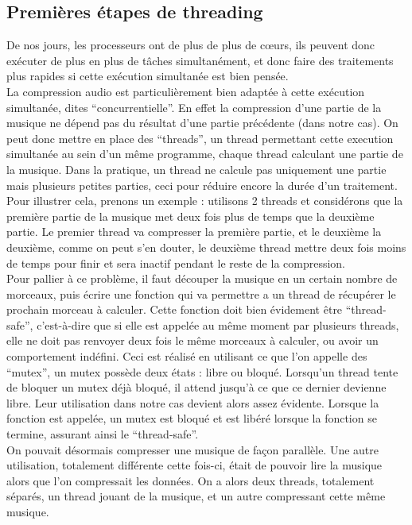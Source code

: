 \documentclass[a4paper,12pt]{article}
\begin{document}
	\subsection{Premières étapes de threading}
De nos jours, les processeurs ont de plus de plus de cœurs, ils peuvent donc
exécuter de plus en plus de tâches simultanément, et donc faire des traitements
plus rapides si cette exécution simultanée est bien pensée.\\
La compression audio est particulièrement bien adaptée à cette exécution
simultanée, dites ``concurrentielle''. En effet la compression d'une partie de
la musique ne dépend pas du résultat d'une partie précédente (dans notre cas).
On peut donc mettre en place des ``threads'', un thread permettant cette
execution simultanée au sein d'un même programme, chaque thread calculant une
partie de la musique. Dans la pratique, un thread ne calcule pas uniquement une
partie mais plusieurs petites parties, ceci pour réduire encore la durée d'un
traitement.  Pour illustrer cela, prenons un exemple : utilisons 2 threads et
considérons que la première partie de la musique met deux fois plus de temps que
la deuxième partie. Le premier thread va compresser la première partie, et le
deuxième la deuxième, comme on peut s'en douter, le deuxième thread mettre deux
fois moins de temps pour finir et sera inactif pendant le reste de la
compression.\\
Pour pallier à ce problème, il faut découper la musique en un certain nombre de
morceaux, puis écrire une fonction qui va permettre a un thread de récupérer le
prochain morceau à calculer. Cette fonction doit bien évidement être
``thread-safe'', c'est-à-dire que si elle est appelée au même moment par
plusieurs threads, elle ne doit pas renvoyer deux fois le même morceaux à
calculer, ou avoir un comportement indéfini. Ceci est réalisé en utilisant ce
que l'on appelle des ``mutex'', un mutex possède deux états : libre ou bloqué.
Lorsqu'un thread tente de bloquer un mutex déjà bloqué, il attend jusqu'à ce que
ce dernier devienne libre. Leur utilisation dans notre cas devient alors assez
évidente. Lorsque la fonction est appelée, un mutex est bloqué et est libéré
lorsque la fonction se termine, assurant ainsi le ``thread-safe''.\\
On pouvait désormais compresser une musique de façon parallèle. Une autre
utilisation, totalement différente cette fois-ci, était de pouvoir lire la
musique alors que l'on compressait les données. On a alors deux threads,
totalement séparés, un thread jouant de la musique, et un autre compressant
cette même musique.\\
\end{document}
